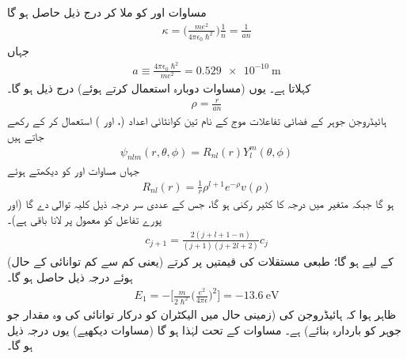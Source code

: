  مساوات   اور  کو ملا کر درج ذیل حاصل ہو گا
\begin{align}
\kappa =\big(\frac{me^{2}}{4\pi\epsilon_{0}\hslash^{2}}\big)\frac{1}{n}=\frac{1}{an} 
\end{align}
جہاں
\begin{align}
a\equiv\frac{4\pi\epsilon_{0}\hslash^{2}}{me^{2}}=\SI{0.529e-10}{\meter}
\end{align}
 کہلاتا ہے۔ یوں (مساوات  دوبارہ استعمال کرتے ہوئے) درج ذیل ہو گا۔
\begin{align}
\rho=\frac{r}{an} 
\end{align}
ہائیڈروجن جوہر کے فضائی تفاعلات  موج کے نام تین کوانٹائی اعداد (،  اور ) استعمال کر کے رکھے جاتے ہیں 
 \begin{align}
\psi_{nlm}(r,\theta,\phi)=R_{nl}(r)Y_{l}^{m}(\theta,\phi) 
\end{align}
 جہاں مساوات  اور  کو دیکھتے ہوئے
 \begin{align}
R_{nl}(r)=\frac{1}{r}\rho^{l+1}e^{-\rho}v(\rho) 
\end{align} 
 ہو گا  جبکہ  متغیر  میں درجہ   کا کثیر رکنی ہو گا، جس کے عددی سر  درجہ ذیل کلیہ توالی دے گا (اور پورے تفاعل کو معمول پر لانا باقی ہے)۔
 \begin{align}\label{مساوات_ابعادی_کلیہ_توالی_کولمب_مخفیہ}
c_{j+1}=\frac{2(j+l+1-n)}{(j+1)(j+2l+2)}c_{j} 
\end{align}
 (یعنی کم سے کم توانائی کے حال)  کے لیے 
  ہو گا؛ طبعی مستقلات کی  قیمتیں پر کرتے ہوئے درجہ ذیل حاصل ہو گا۔
 \begin{align}
E_{1}=-\big[\frac{m}{2\hslash^{2}}\big(\frac{e^{2}}{4\pi\epsilon}\big)^{2}\big]=\SI{-13.6}{\electronvolt}
\end{align}
 ظاہر ہوا کہ  ہائیڈروجن کی  (زمینی حال میں الیکٹران کو درکار  توانائی کی وہ مقدار جو جوہر کو باردارہ بنائے)   ہے۔ مساوات  کے تحت   لہٰذا   ہو گا (مساوات  دیکھیے) یوں درجہ ذیل ہو گا۔
